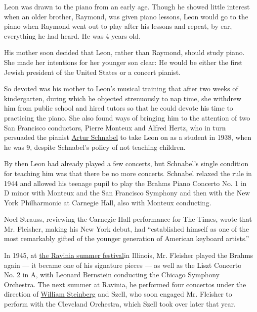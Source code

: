 Leon was drawn to the piano from an early age. Though he showed little
interest when an older brother, Raymond, was given piano lessons, Leon
would go to the piano when Raymond went out to play after his lessons
and repeat, by ear, everything he had heard. He was 4 years old.

His mother soon decided that Leon, rather than Raymond, should study
piano. She made her intentions for her younger son clear: He would be
either the first Jewish president of the United States or a concert
pianist.

So devoted was his mother to Leon's musical training that after two
weeks of kindergarten, during which he objected strenuously to nap time,
she withdrew him from public school and hired tutors so that he could
devote his time to practicing the piano. She also found ways of bringing
him to the attention of two San Francisco conductors, Pierre Monteux and
Alfred Hertz, who in turn persuaded the pianist
\href{https://www.nytimes3xbfgragh.onion/1951/08/16/archives/artur-schnabel-69-famed-pianist-dies-best-known-for-interpretation.html}{Artur
Schnabel} to take Leon on as a student in 1938, when he was 9, despite
Schnabel's policy of not teaching children.

By then Leon had already played a few concerts, but Schnabel's single
condition for teaching him was that there be no more concerts. Schnabel
relaxed the rule in 1944 and allowed his teenage pupil to play the
Brahms Piano Concerto No. 1 in D minor with Monteux and the San
Francisco Symphony and then with the New York Philharmonic at Carnegie
Hall, also with Monteux conducting.

Noel Strauss, reviewing the Carnegie Hall performance for The Times,
wrote that Mr. Fleisher, making his New York debut, had ``established
himself as one of the most remarkably gifted of the younger generation
of American keyboard artists.''

In 1945, at \href{https://www.ravinia.org/Page/History}{the Ravinia
summer festival}in Illinois, Mr. Fleisher played the Brahms again --- it
became one of his signature pieces --- as well as the Liszt Concerto No.
2 in A, with Leonard Bernstein conducting the Chicago Symphony
Orchestra. The next summer at Ravinia, he performed four concertos under
the direction of
\href{https://www.nytimes3xbfgragh.onion/1978/05/17/archives/william-steinberg-orchestral-conductor-dies-at-78-former-music.html}{William
Steinberg} and Szell, who soon engaged Mr. Fleisher to perform with the
Cleveland Orchestra, which Szell took over later that year.

